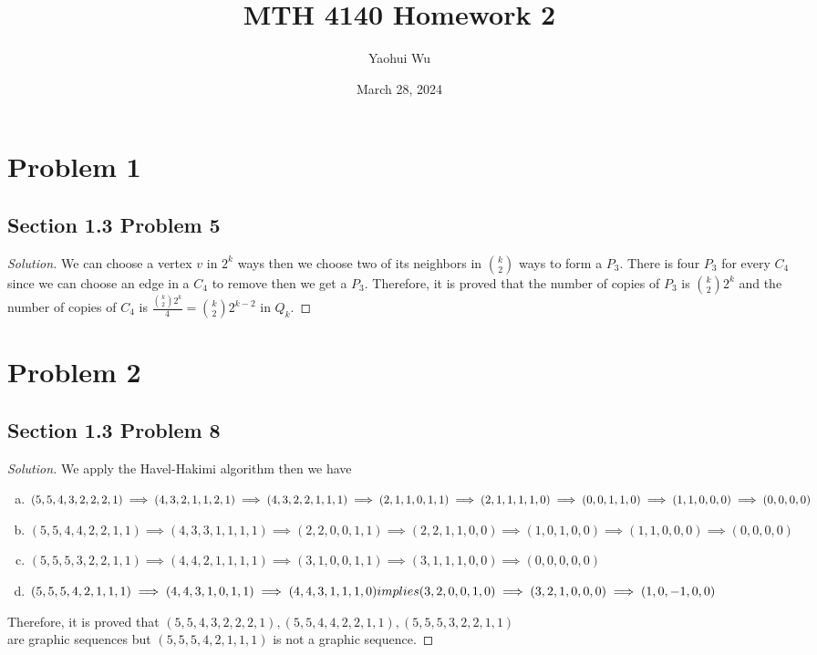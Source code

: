 \documentclass[12pt]{article}
\title{MTH 4140 Homework 2}
\author{Yaohui Wu}
\date{March 28, 2024}
\newenvironment*{solution}{\begin{proof}[Solution]}{\end{proof}}
\begin{document}
\maketitle
\section*{Problem 1}
\subsection*{Section 1.3 Problem 5}
\begin{solution}
    We can choose a vertex \(v\) in \(2^k\) ways then we choose two of its
    neighbors in \(\binom{k}{2}\) ways to form a \(P_3\). There is four \(P_3
    \) for every \(C_4\) since we can choose an edge in a \(C_4\) to remove
    then we get a \(P_3\). Therefore, it is proved that the number of copies
    of \(P_3\) is \(\binom{k}{2}2^k\) and the number of copies of \(C_4\) is
    \(\frac{\binom{k}{2}2^k}{4}=\binom{k}{2}2^{k-2}\) in \(Q_k\).
\end{solution}
\section*{Problem 2}
\subsection*{Section 1.3 Problem 8}
\begin{solution}
    We apply the Havel-Hakimi algorithm then we have
    \begin{enumerate}[(a)]
        \item \((5,5,4,3,2,2,2,1)\implies(4,3,2,1,1,2,1)\implies(4,3,2,2,1,1,1
        )\implies(2,1,1,0,1,1) \\ \implies(2,1,1,1,1,0)\implies(0,0,1,1,0)
        \implies(1,1,0,0,0)\implies(0,0,0,0)\)
        \item \((5,5,4,4,2,2,1,1)\implies(4,3,3,1,1,1,1)\implies(2,2,0,0,1,1)
        \implies(2,2,1,1,0,0)\implies(1,0,1,0,0)\implies(1,1,0,0,0)\implies(0,
        0,0,0)\)
        \item \((5,5,5,3,2,2,1,1)\implies(4,4,2,1,1,1,1)\implies(3,1,0,0,1,1)
        \implies(3,1,1,1,0,0)\implies(0,0,0,0,0)\)
        \item \((5,5,5,4,2,1,1,1)\implies(4,4,3,1,0,1,1)\implies(4,4,3,1,1,1,0
        )\ \\ implies(3,2,0,0,1,0)\implies(3,2,1,0,0,0)\implies(1,0,-1,0,0)\)
    \end{enumerate}
    Therefore, it is proved that \((5,5,4,3,2,2,2,1),(5,5,4,4,2,2,1,1),(5,5,5,3
    ,2,2,1,1)\) \\ are graphic sequences but \((5,5,5,4,2,1,1,1)\)  is not a
    graphic sequence.
\end{solution}
\end{document}
